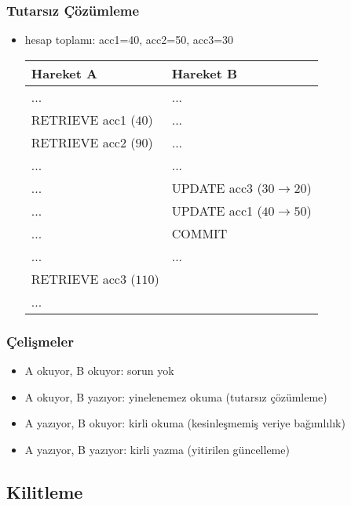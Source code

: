 \documentclass[dvipsnames]{beamer}
\theoremstyle{plain}
\begin{document}
\begin{frame}[fragile]
  \frametitle{Tutarsız Çözümleme}

  \begin{itemize}
    \item hesap toplamı: acc1=40, acc2=50, acc3=30
    \smallskip
    \begin{table}
      \begin{tabular}{ll}
Hareket A             & Hareket B                        \\\hline
...                   & ...                              \\\pause
RETRIEVE acc1 ($40$)  & ...                              \\\pause
RETRIEVE acc2 ($90$)  & ...                              \\\pause
...                   & ...                              \\
...                   & UPDATE acc3 ($30 \rightarrow 20$)\\
...                   & UPDATE acc1 ($40 \rightarrow 50$)\\
...                   & COMMIT                           \\\pause
...                   & ...                              \\
RETRIEVE acc3 ($110$) &                                  \\
...                   &
      \end{tabular}
    \end{table}
  \end{itemize}
\end{frame}

\begin{frame}
  \frametitle{Çelişmeler}

  \begin{itemize}
    \item A okuyor, B okuyor: sorun yok
    \item A okuyor, B yazıyor: yinelenemez okuma (tutarsız çözümleme)
    \item A yazıyor, B okuyor: kirli okuma (kesinleşmemiş veriye bağımlılık)
    \item A yazıyor, B yazıyor: kirli yazma (yitirilen güncelleme)
  \end{itemize}
\end{frame}


\subsection{Kilitleme}
\end{document}
